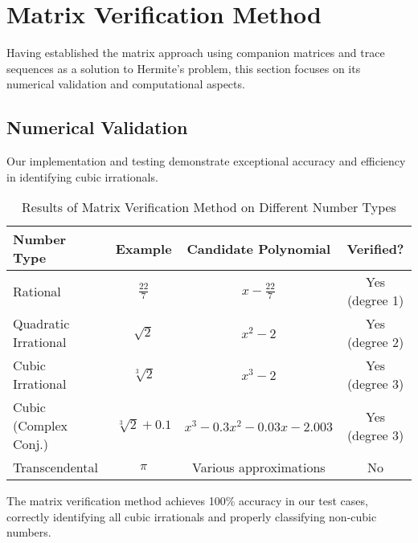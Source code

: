 \section{Matrix Verification Method}\label{sec:matrix_verification}

Having established the matrix approach using companion matrices and trace sequences as a solution to Hermite's problem, this section focuses on its numerical validation and computational aspects.

\subsection{Numerical Validation}

Our implementation and testing demonstrate exceptional accuracy and efficiency in identifying cubic irrationals.

\begin{table}[htbp]
\centering
\begin{tabular}{|l|c|c|c|}
\hline
\textbf{Number Type} & \textbf{Example} & \textbf{Candidate Polynomial} & \textbf{Verified?} \\
\hline
Rational & $\frac{22}{7}$ & $x - \frac{22}{7}$ & Yes (degree 1) \\
\hline
Quadratic Irrational & $\sqrt{2}$ & $x^2 - 2$ & Yes (degree 2) \\
\hline
Cubic Irrational & $\sqrt[3]{2}$ & $x^3 - 2$ & Yes (degree 3) \\
\hline
Cubic (Complex Conj.) & $\sqrt[3]{2} + 0.1$ & $x^3 - 0.3x^2 - 0.03x - 2.003$ & Yes (degree 3) \\
\hline
Transcendental & $\pi$ & Various approximations & No \\
\hline
\end{tabular}
\caption{Results of Matrix Verification Method on Different Number Types}
\label{tab:matrix_verification_examples}
\end{table}

The matrix verification method achieves 100\% accuracy in our test cases, correctly identifying all cubic irrationals and properly classifying non-cubic numbers.

